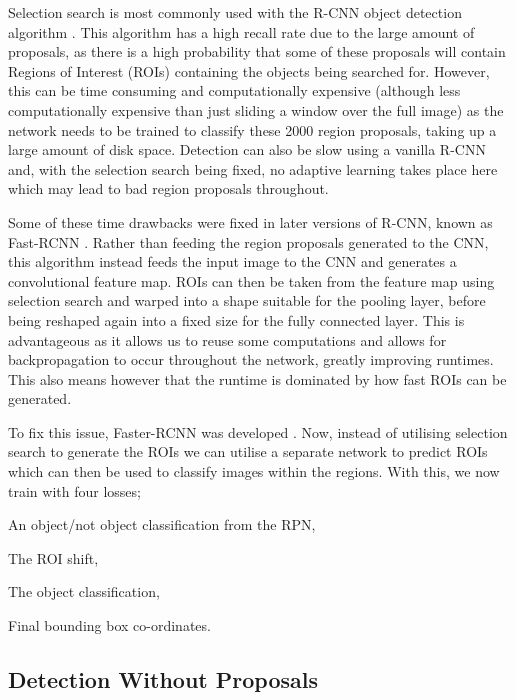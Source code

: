 Selection search is most commonly used with the R-CNN object detection algorithm \cite{girshick_rich_2014}. This algorithm has a high recall rate due to the large amount of proposals, as there is a high probability that some of these proposals will contain Regions of Interest (ROIs) containing the objects being searched for. However, this can be time consuming and computationally expensive (although less computationally expensive than just sliding a window over the full image) as the network needs to be trained to classify these 2000 region proposals, taking up a large amount of disk space. Detection can also be slow using a vanilla R-CNN and, with the selection search being fixed, no adaptive learning takes place here which may lead to bad region proposals throughout. 

Some of these time drawbacks were fixed in later versions of R-CNN, known as Fast-RCNN \cite{girshick_fast_2015}. Rather than feeding the region proposals generated to the CNN, this algorithm instead feeds the input image to the CNN and generates a convolutional feature map. ROIs can then be taken from the feature map using selection search and warped into a shape suitable for the pooling layer, before being reshaped again into a fixed size for the fully connected layer. This is advantageous as it allows us to reuse some computations and allows for backpropagation to occur throughout the network, greatly improving runtimes.  This also means however that the runtime is dominated by how fast ROIs can be generated. 

To fix this issue, Faster-RCNN was developed \cite{ren_faster_2015}. Now, instead of utilising selection search to generate the ROIs we can utilise a separate network to predict ROIs which can then be used to classify images within the regions. With this, we now train with four losses; 

\begin{enumerate*}
	\item An object/not object classification from the RPN,
	\item The ROI shift,
	\item The object classification,
	\item Final bounding box co-ordinates.
\end{enumerate*}

\subsection{Detection Without Proposals}\label{ch:Background,sec:objectDetection,sub:noProposals}

